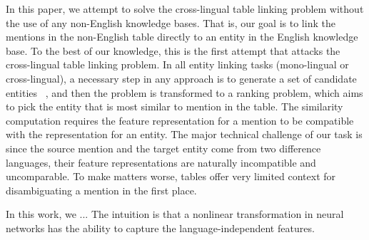In this paper, we attempt to solve the cross-lingual table linking problem
without the use of any non-English knowledge bases. That is, our goal is
to link the mentions in the non-English table directly to an entity in
the English knowledge base.   
To the best of our knowledge, this is the first attempt that attacks the 
cross-lingual table linking problem. 
In all entity linking tasks (mono-lingual or cross-lingual), 
a necessary step in any approach is to generate a set of candidate entities
~\cite{tsai2016cross,mcnamee2011cross,bhagavatula2015tabel,wu2016entity},
and then the problem is transformed to a ranking problem, which aims to pick
the entity that is most similar to mention in the table. 
The similarity computation requires the feature representation for a mention to be 
compatible with the representation for an entity. 
The major technical challenge of our task is since the source mention
and the target entity come from two difference languages,
their feature representations are naturally incompatible and uncomparable. 
To make matters worse, tables offer very limited context for disambiguating
a mention in the first place.


In this work, we ... 
The intuition is that a nonlinear transformation in neural networks has 
the ability to capture the language-independent features. 

%


